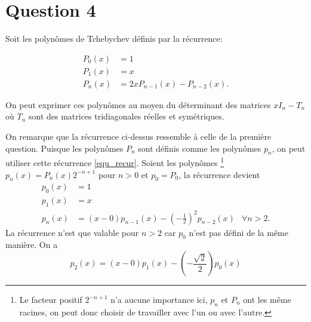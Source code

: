 \section*{Question 4}
Soit les polynômes de Tchebychev définis par la récurrence:

\begin{align*}
  P_0(x) & = 1\\
  P_1(x) & = x\\
  P_n(x) & = 2xP_{n-1}(x) - P_{n-2}(x).
\end{align*}

On peut exprimer ces polynômes au moyen du déterminant des matrices $xI_n - T_n$ où $T_n$ sont des matrices tridiagonales réelles et symétriques.

On remarque que la récurrence ci-dessus ressemble à celle de la première question.
Puisque les polynômes $P_n$ sont définis comme les polynômes $p_n$,
on peut utiliser cette récurrence \eqref{equ_recur}.
Soient les polynômes
\footnote{Le facteur positif $2^{-n+1}$ n'a aucune importance ici,
$p_n$ et $P_n$ ont les même racines,
on peut donc choisir de travailler avec l'un ou avec l'autre.}
$p_n(x) = P_n(x)2^{-n+1}$ pour $n > 0$ et $p_0 = P_0$, la récurrence devient
\begin{align*}
  p_0(x) & = 1\\
  p_1(x) & = x\\
  p_n(x) & = (x - 0)p_{n-1}(x) - \left(-\frac{1}{2}\right)^2p_{n-2}(x) & \forall n > 2.
\end{align*}
La récurrence n'est que valable pour $n > 2$ car $p_0$ n'est pas défini de
la même manière.
On a
\[ p_2(x) = (x - 0)p_1(x) - \left(-\frac{\sqrt{2}}{2}\right)p_0(x) \]

